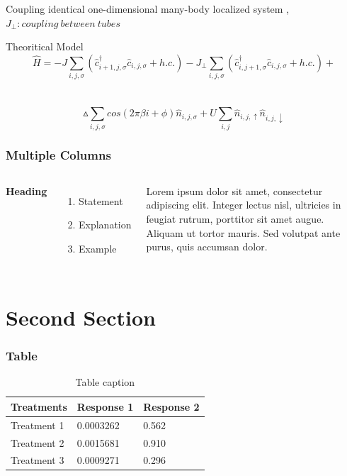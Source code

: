 \documentclass{beamer}
\begin{document}
\begin{frame}
Coupling identical one-dimensional many-body localized system ,$J_{\perp}:coupling\ between\ tubes$
\begin{block}{Theoritical Model}
$$\hat{H}=-J\sum_{i,j,\sigma}(\hat{c}_{i+1,j,\sigma}^{\dagger}\hat{c}_{i,j,\sigma}+h.c.)-J_{\perp}\sum_{i,j,\sigma}(\hat{c}_{i,j+1,\sigma}^{\dagger}\hat{c}_{i,j,\sigma}+h.c.)+$$\\~
$$\vartriangle \sum_{i,j,\sigma}cos(2\pi\beta i+\phi)\hat{n}_{i,j,\sigma}+U\sum_{i,j}\hat{n}_{i,j,\uparrow}\hat{n}_{i,j,\downarrow}$$
\end{block}
\end{frame}

\begin{frame}
\frametitle{Multiple Columns}
\begin{columns}[c] %

\textbf{Heading}
\begin{enumerate}
\item Statement
\item Explanation
\item Example
\end{enumerate}

Lorem ipsum dolor sit amet, consectetur adipiscing elit. Integer lectus nisl, ultricies in feugiat rutrum, porttitor sit amet augue. Aliquam ut tortor mauris. Sed volutpat ante purus, quis accumsan dolor.

\end{columns}
\end{frame}

\section{Second Section}

\begin{frame}
\frametitle{Table}
\begin{table}
\begin{tabular}{l l l}
\toprule
\textbf{Treatments} & \textbf{Response 1} & \textbf{Response 2}\\
\midrule
Treatment 1 & 0.0003262 & 0.562 \\
Treatment 2 & 0.0015681 & 0.910 \\
Treatment 3 & 0.0009271 & 0.296 \\
\bottomrule
\end{tabular}
\caption{Table caption}
\end{table}
\end{frame}
\end{document}
